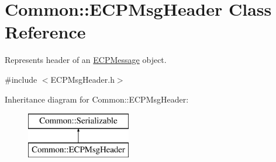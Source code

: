\hypertarget{class_common_1_1_e_c_p_msg_header}{\section{Common\-:\-:E\-C\-P\-Msg\-Header Class Reference}
\label{class_common_1_1_e_c_p_msg_header}
}


Represents header of an \hyperlink{class_common_1_1_e_c_p_message}{E\-C\-P\-Message} object.  




{\ttfamily \#include $<$E\-C\-P\-Msg\-Header.\-h$>$}

Inheritance diagram for Common\-:\-:E\-C\-P\-Msg\-Header\-:\begin{figure}[H]
\begin{center}
\leavevmode
\includegraphics[height=2.000000cm]{class_common_1_1_e_c_p_msg_header}
\end{center}
\end{figure}
